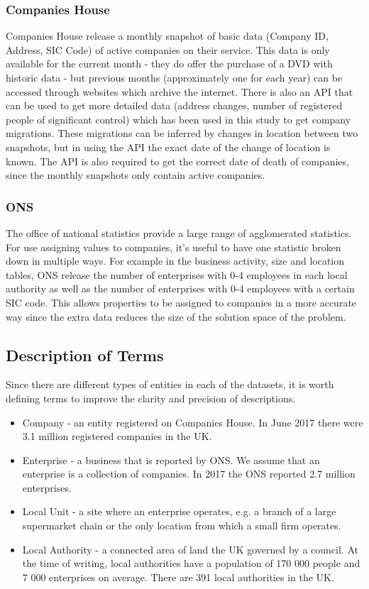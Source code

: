 \documentclass[a4paper,10pt]{article}
\begin{document}
\subsubsection{Companies House}
Companies House release a monthly snapshot of basic data (Company ID, Address, SIC Code) of active companies on their service. This data is only available for the current month - they do offer the purchase of a DVD with historic data - but previous months (approximately one for each year) can be accessed through websites which archive the internet. There is also an API that can be used to get more detailed data (address changes, number of registered people of significant control) which has been used in this study to get company migrations. These migrations can be inferred by changes in location between two snapshots, but in using the API the exact date of the change of location is known. The API is also required to get the correct date of death of companies, since the monthly snapshots only contain active companies.

\subsubsection{ONS}
The office of national statistics provide a large range of agglomerated statistics. For use assigning values to companies, it's useful to have one statistic broken down in multiple ways. For example in the business activity, size and location tables, ONS release the number of enterprises with 0-4 employees in each local authority as well as the number of enterprises with 0-4 employees with a certain SIC code. This allows properties to be assigned to companies in a more accurate way since the extra data reduces the size of the solution space of the problem.

\subsection{Description of Terms}
Since there are different types of entities in each of the datasets, it is worth defining terms to improve the clarity and precision of descriptions.
\begin{itemize}
 \item Company - an entity registered on Companies House. In June 2017 there were 3.1 million registered companies in the UK. 
 \item Enterprise - a business that is reported by ONS. We assume that an enterprise is a collection of companies. In 2017 the ONS reported 2.7 million enterprises.
 \item Local Unit - a site where an enterprise operates, e.g. a branch of a large supermarket chain or the only location from which a small firm operates.
 \item Local Authority - a connected area of land the UK governed by a council. At the time of writing, local authorities have a population of 170 000 people and 7 000 enterprises on average. There are 391 local authorities in the UK.
\end{itemize}
\end{document}
